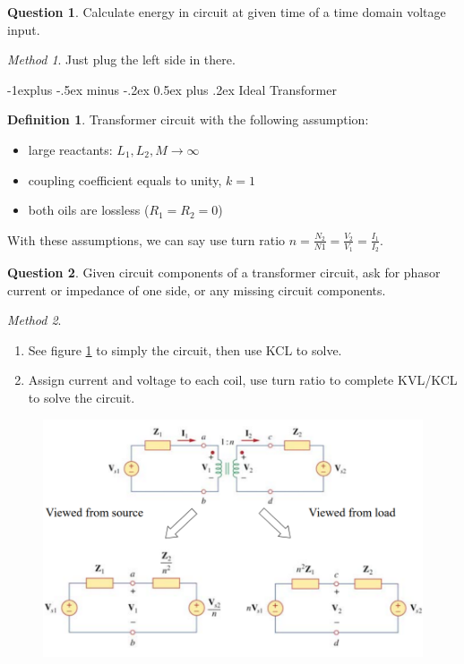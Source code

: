 \documentclass[10pt,landscape]{article}
\makeatletter
\renewcommand{\subsection}{\@startsection{subsection}{2}{0mm}%
                                {-1explus -.5ex minus -.2ex}%
                                {0.5ex plus .2ex}%
                                {\normalfont\normalsize\bfseries}}
\theoremstyle{definition}
\newtheorem*{question}{Question}
\newtheorem*{defin}{Definition}
\theoremstyle{remark}
\newtheorem*{method}{Method}
\makeatother
\begin{document}
\begin{multicols}{3}
\begin{question}
Calculate energy in circuit at given time of a time domain voltage input. 
\end{question}
\begin{method}
Just plug the left side in there. 
\end{method}


\subsection{Ideal Transformer}
\begin{defin}
Transformer circuit with the following assumption: \\
\begin{itemize}[noitemsep,nolistsep]
    \item large reactants: $L_1,L_2,M \rightarrow \infty$
    \item coupling coefficient equals to unity, $k=1$
    \item both oils are lossless ($R_1 = R_2 = 0$)
\end{itemize}
With these assumptions, we can say use turn ratio $n = \frac{N_2}{N1} = \frac{V_2}{V_1} = \frac{I_1}{I_2}$. 
\end{defin}

\begin{question}
Given circuit components of a transformer circuit, ask for phasor current or impedance of one side, or any missing circuit components. 
\end{question}

\begin{method} \mbox{} \\
\begin{enumerate}
    \item See figure \ref{fig:trans_ideal_simp} to simply the circuit, then use KCL to solve.
    \item Assign current and voltage to each coil, use turn ratio to complete KVL/KCL to solve the circuit. 
\end{enumerate}

\end{method}

\begin{figure}[H]
    \centering
    \includegraphics[width=0.9\linewidth]{202/figure/trrans_3.png}
    \caption{}
    \label{fig:trans_ideal_simp}
\end{figure}



\end{multicols}
\end{document}
